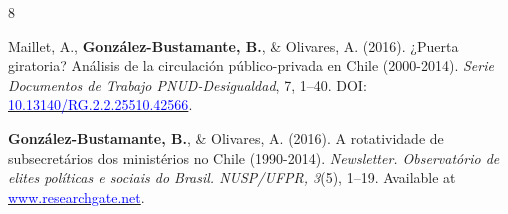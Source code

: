 \begin{publications}
\begin{benumerate}{8}



\item{Maillet, A., {\bfseries González-Bustamante, B.}, \& Olivares, A. (2016). ¿Puerta giratoria? Análisis de la circulación público-privada en Chile (2000-2014). {\itshape Serie Documentos de Trabajo PNUD-Desigualdad}, 7, 1--40. DOI: \\ \href{http://doi.org/10.13140/RG.2.2.25510.42566}{\textcolor{blue}{10.13140/RG.2.2.25510.42566}}.}\vspace{1mm}


\item{{\bfseries González-Bustamante, B.}, \& Olivares, A. (2016). A rotatividade de subsecretários dos ministérios no Chile (1990-2014). {\itshape Newsletter. Observat\'orio de elites pol\'iticas e sociais do Brasil. NUSP/UFPR, 3}(5), 1--19. Available at \href{https://www.researchgate.net/publication/321993740_A_rotatividade_de_subsecretarios_dos_ministerios_no_Chile_1990-2014}{\textcolor{blue}{www.researchgate.net}}.}\vspace{1mm}


\end{benumerate}
\end{publications}
